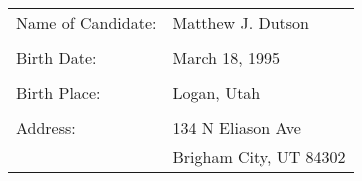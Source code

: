 \begin{center}
\vspace*{\fill}

\begin{tabular}{l l}
Name of Candidate: & Matthew J. Dutson    \\ & \\
Birth Date:        & March 18, 1995       \\ & \\
Birth Place:       & Logan, Utah          \\ & \\
Address:           & 134 N Eliason Ave    \\
                   & Brigham City, UT 84302
\end{tabular}

\vspace*{\fill}
\end{center}